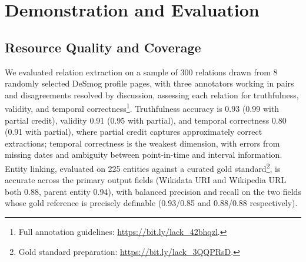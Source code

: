 \vspace{-0.3cm}\section{Demonstration and Evaluation}
\label{sec:evaluation}

\vspace{-0.3cm}\subsection{Resource Quality and Coverage}\vspace{-0.2cm}
\label{sec:eval:quality}
We evaluated relation extraction on a sample of 300 relations drawn from 8 randomly selected DeSmog profile pages, with three annotators working in pairs and disagreements resolved by discussion, assessing each relation for truthfulness, validity, and temporal correctness\footnote{Full annotation guidelines: \url{https://bit.ly/lack_42bhqzl}.}.
Truthfulness accuracy is 0.93 (0.99 with partial credit), validity 0.91 (0.95 with partial), and temporal correctness 0.80 (0.91 with partial), where partial credit captures approximately correct extractions; temporal correctness is the weakest dimension, with errors from missing dates and ambiguity between point-in-time and interval information.
Entity linking, evaluated on 225 entities against a curated gold standard\footnote{Gold standard preparation: \url{https://bit.ly/lack_3QQPRsD}.}, is accurate across the primary output fields (Wikidata URI and Wikipedia URL both 0.88, parent entity 0.94), with balanced precision and recall on the two fields whose gold reference is precisely definable (0.93/0.85 and 0.88/0.88 respectively).
